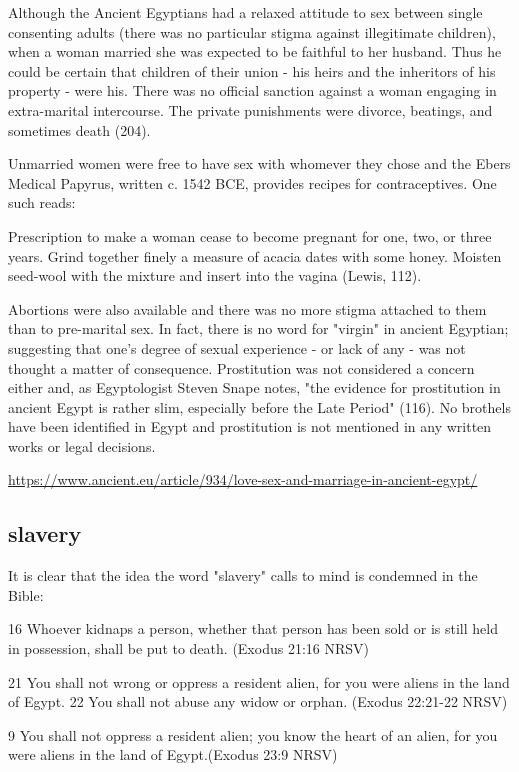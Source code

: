 \documentclass[11pt]{article}
\begin{document}
Although the Ancient Egyptians had a relaxed attitude to sex between single consenting adults (there was no particular stigma against illegitimate children), when a woman married she was expected to be faithful to her husband. Thus he could be certain that children of their union - his heirs and the inheritors of his property - were his. There was no official sanction against a woman engaging in extra-marital intercourse. The private punishments were divorce, beatings, and sometimes death (204).


Unmarried women were free to have sex with whomever they chose and the Ebers Medical Papyrus, written c. 1542 BCE, provides recipes for contraceptives. One such reads:

Prescription to make a woman cease to become pregnant for one, two, or three years. Grind together finely a measure of acacia dates with some honey. Moisten seed-wool with the mixture and insert into the vagina (Lewis, 112).

Abortions were also available and there was no more stigma attached to them than to pre-marital sex. In fact, there is no word for "virgin" in ancient Egyptian; suggesting that one's degree of sexual experience - or lack of any - was not thought a matter of consequence. Prostitution was not considered a concern either and, as Egyptologist Steven Snape notes, "the evidence for prostitution in ancient Egypt is rather slim, especially before the Late Period" (116). No brothels have been identified in Egypt and prostitution is not mentioned in any written works or legal decisions. 


\url{https://www.ancient.eu/article/934/love-sex-and-marriage-in-ancient-egypt/}



\subsection{slavery}
It is clear that the idea the word "slavery" calls to mind is condemned in the Bible:

16 Whoever kidnaps a person, whether that person has been sold or is still held in possession, shall be put to death. (Exodus 21:16 NRSV)

21 You shall not wrong or oppress a resident alien, for you were aliens in the land of Egypt. 22 You shall not abuse any widow or orphan. (Exodus 22:21-22 NRSV)


9 You shall not oppress a resident alien; you know the heart of an alien, for you were aliens in the land of Egypt.(Exodus 23:9 NRSV)
\end{document}

